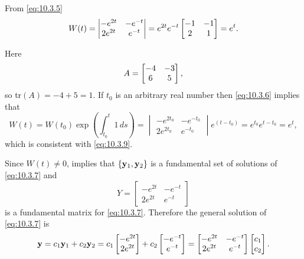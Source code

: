 \begin{alistSolution}
\item
From \eqref{eq:10.3.5}
\begin{equation} \label{eq:10.3.9}
W(t)=\begin{vmatrix}-e^{2t}&-e^{-t}\\2e^{2t}&e^{-t}\end{vmatrix}
=e^{2t}e^{-t}
\begin{bmatrix}-1&-1\\2&1\end{bmatrix}=e^t.
\end{equation}

\item  Here
\[
A=\begin{bmatrix}-4&-3\\6&5\end{bmatrix},
\]
so
tr$(A)=-4+5=1$. If $t_0$ is an arbitrary real number then
\eqref{eq:10.3.6}  implies that
\[
W(t)=W(t_0)\exp{\left(\int_{t_0}^t1\,ds\right)}=
\begin{vmatrix}
-e^{2t_0}&-e^{-t_0}\\
2e^{2t_0}&e^{-t_0}
\end{vmatrix}e^{(t-t_0)}
=e^{t_0}e^{t-t_0}=e^t,
\]
which is consistent with \eqref{eq:10.3.9}.

\item Since $W(t)\ne0$,
 implies that $\{\mathbf{y}_1,\mathbf{y}_2\}$ is
a fundamental set of solutions  of \eqref{eq:10.3.7} and
\[
Y=\begin{bmatrix}-e^{2t}&-e^{-t}\\2e^{2t}&e^{-t}\end{bmatrix}
\]
is a fundamental matrix for \eqref{eq:10.3.7}.
 Therefore the general
solution of \eqref{eq:10.3.7} is
\begin{equation} \label{eq:10.3.10}
\mathbf{y}=c_1\mathbf{y}_1+c_2\mathbf{y}_2=
c_1\begin{bmatrix}-e^{2t}\\2e^{2t}\end{bmatrix}+c_2\begin{bmatrix}-e^{-t}\\e^{-t}\end{bmatrix}
=\begin{bmatrix}-e^{2t}&-e^{-t}\\2e^{2t}&e^{-t}\end{bmatrix}
\begin{bmatrix}c_1\\c_2\end{bmatrix}.
\end{equation}


\end{alistSolution}
